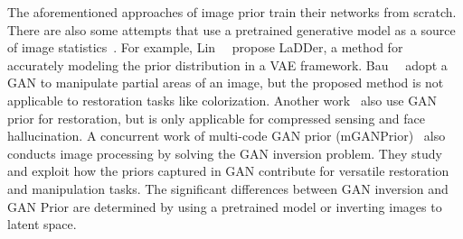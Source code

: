 The aforementioned approaches of image prior train their networks from scratch.
There are also some attempts that use a pretrained generative model as a source of image statistics~\cite{bau2019semantic,hussein2019image}.
For example, 
Lin~\etal~\cite{Lin2020LaDDer} propose LaDDer, a method for accurately modeling the prior distribution in a VAE framework.
Bau~\etal~\cite{bau2019semantic} adopt a GAN to manipulate partial areas of an image, but the proposed method is not applicable to restoration tasks like colorization.
Another work~\cite{hussein2019image} also use GAN prior for restoration, but is only applicable for compressed sensing and face hallucination.
A concurrent work of multi-code GAN prior (mGANPrior)~\cite{gu2020image} also conducts image processing by solving the GAN inversion problem. They study and exploit how the priors captured in GAN contribute for versatile restoration and manipulation tasks. 
The significant differences between GAN inversion and GAN Prior are determined by using a pretrained model or inverting images to latent space.
